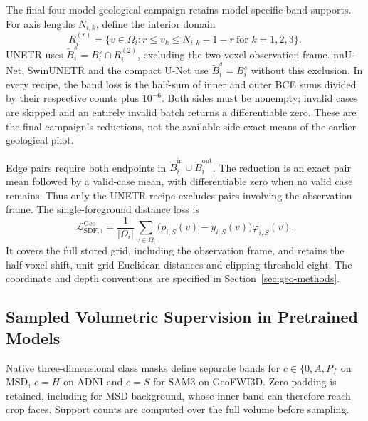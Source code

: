 \documentclass[12pt,a4paper]{article}
\begin{document}
The final four-model geological campaign retains model-specific band
supports. For axis lengths $N_{i,k}$, define the interior domain
\begin{equation}
R_i^{(r)}=\{v\in\Omega_i:
 r\leq v_k\leq N_{i,k}-1-r\ \text{for }k=1,2,3\}.
\label{eq:geological-band-frame}
\end{equation}
UNETR uses $\widetilde B_i^s=B_i^s\cap R_i^{(2)}$, excluding the
two-voxel observation frame. nnU-Net, SwinUNETR and the compact U-Net
use $\widetilde B_i^s=B_i^s$ without this exclusion. In every recipe,
the band loss is the half-sum of inner and outer BCE sums divided
by their respective counts plus $10^{-6}$. Both sides must be
nonempty; invalid cases are skipped and an entirely invalid batch
returns a differentiable zero. These are the final campaign's
reductions, not the available-side exact means of the earlier
geological pilot.

Edge pairs require both endpoints in
$\widetilde B_i^{\mathrm{in}}\cup\widetilde B_i^{\mathrm{out}}$.
The reduction is an exact pair mean followed by a valid-case mean,
with differentiable zero when no valid case remains. Thus only the
UNETR recipe excludes pairs involving the observation frame.
The single-foreground distance loss is
\begin{equation}
\mathcal{L}_{\mathrm{SDF},i}^{\mathrm{Geo}}
=\frac{1}{|\Omega_i|}\sum_{v\in\Omega_i}
 \bigl(p_{i,S}(v)-y_{i,S}(v)\bigr)\varphi_{i,S}(v).
\label{eq:geological-sdf-loss}
\end{equation}
It covers the full stored grid, including the observation frame,
and retains the half-voxel shift, unit-grid Euclidean distances and
clipping threshold eight. The coordinate and depth conventions are
specified in Section~\ref{sec:geo-methods}.

\subsection{Sampled Volumetric Supervision in Pretrained Models}
\label{sec:sampled-pretrained-supervision}

Native three-dimensional class masks define separate bands for
$c\in\{0,A,P\}$ on MSD, $c=H$ on ADNI and $c=S$ for SAM3 on
GeoFWI3D. Zero padding is retained, including for MSD background,
whose inner band can therefore reach crop faces. Support counts are
computed over the full volume before sampling.
\end{document}
